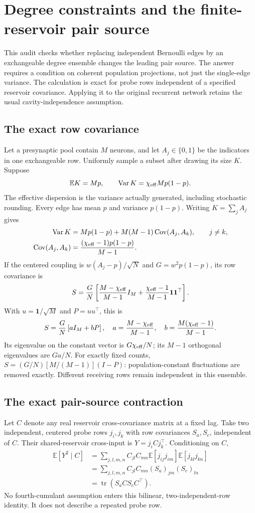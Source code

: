 \section{Degree constraints and the finite-reservoir pair source}
\label{sec:review-degree-contraction}

This audit checks whether replacing independent Bernoulli edges by an
exchangeable degree ensemble changes the leading pair source. The answer
requires a condition on coherent population projections, not just the
single-edge variance. The calculation is exact for probe rows independent
of a specified reservoir covariance. Applying it to the original recurrent
network retains the usual cavity-independence assumption.

\subsection{The exact row covariance}
Let a presynaptic pool contain $M$ neurons, and let $A_j\in\{0,1\}$ be the
indicators in one exchangeable row. Uniformly sample a subset after drawing
its size $K$. Suppose
\[
 \mathbb E K=Mp,\qquad
 \operatorname{Var}K=\chi_{\rm eff}Mp(1-p).
\]
The effective dispersion is the variance actually generated, including
stochastic rounding. Every edge has mean $p$ and variance $p(1-p)$.
Writing $K=\sum_jA_j$ gives
\begin{align*}
 \operatorname{Var}K
 &=Mp(1-p)+M(M-1)\operatorname{Cov}(A_j,A_k),\qquad j\ne k,\\
 \operatorname{Cov}(A_j,A_k)
 &=\frac{(\chi_{\rm eff}-1)p(1-p)}{M-1}.
\end{align*}
If the centered coupling is $w(A_j-p)/\sqrt N$ and
$G=w^2p(1-p)$, its row covariance is
\[
 S=\frac GN\left[
   \frac{M-\chi_{\rm eff}}{M-1}I_M+
   \frac{\chi_{\rm eff}-1}{M-1}\mathbf1\mathbf1^\top\right].
\]
With $u=\mathbf1/\sqrt M$ and $P=uu^\top$, this is
\[
 S=\frac GN\left[a I_M+bP\right],\quad
 a=\frac{M-\chi_{\rm eff}}{M-1},\quad
 b=\frac{M(\chi_{\rm eff}-1)}{M-1}.
\]
Its eigenvalue on the constant vector is $G\chi_{\rm eff}/N$; its
$M-1$ orthogonal eigenvalues are $Ga/N$. For exactly fixed counts,
$S=(G/N)[M/(M-1)](I-P)$: population-constant fluctuations are removed
exactly. Different receiving rows remain independent in this ensemble.

\subsection{The exact pair-source contraction}
Let $C$ denote any real reservoir cross-covariance matrix at a fixed lag.
Take two independent, centered probe rows $j_i,j_k$ with row covariances
$S_a,S_c$, independent of $C$. Their shared-reservoir cross-input is
$Y=j_i C j_k^\top$. Conditioning on $C$,
\begin{align*}
 \mathbb E[Y^2\mid C]
 &=\sum_{j,l,m,n}C_{jl}C_{mn}
    \mathbb E[j_{ij}j_{im}]\mathbb E[j_{kl}j_{kn}]\\
 &=\sum_{j,l,m,n}C_{jl}C_{mn}(S_a)_{jm}(S_c)_{ln}\\
 &=\boxed{\operatorname{tr}(S_a C S_c C^\top)}.
\end{align*}
No fourth-cumulant assumption enters this bilinear, two-independent-row
identity. It does not describe a repeated probe row.

